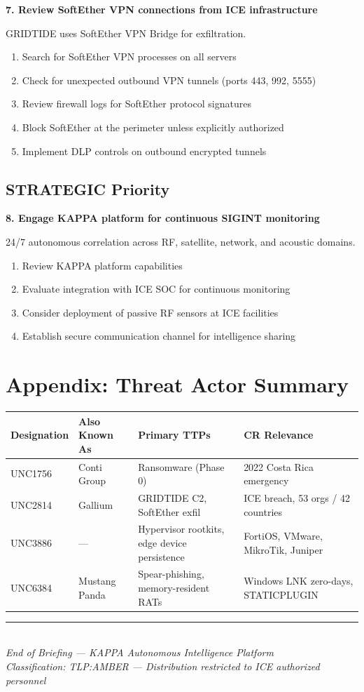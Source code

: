 \documentclass[11pt,a4paper]{article}
\begin{document}
\textbf{7. Review SoftEther VPN connections from ICE infrastructure}

GRIDTIDE uses SoftEther VPN Bridge for exfiltration.

\begin{enumerate}[label=\alph*., leftmargin=1.5cm]
\item Search for SoftEther VPN processes on all servers
\item Check for unexpected outbound VPN tunnels (ports 443, 992, 5555)
\item Review firewall logs for SoftEther protocol signatures
\item Block SoftEther at the perimeter unless explicitly authorized
\item Implement DLP controls on outbound encrypted tunnels
\end{enumerate}

\subsection{STRATEGIC Priority}

\textbf{8. Engage KAPPA platform for continuous SIGINT monitoring}

24/7 autonomous correlation across RF, satellite, network, and acoustic domains.

\begin{enumerate}[label=\alph*., leftmargin=1.5cm]
\item Review KAPPA platform capabilities
\item Evaluate integration with ICE SOC for continuous monitoring
\item Consider deployment of passive RF sensors at ICE facilities
\item Establish secure communication channel for intelligence sharing
\end{enumerate}

\section{Appendix: Threat Actor Summary}

\begin{longtable}{@{} p{2.5cm} p{3cm} p{3cm} p{5cm} @{}}
\toprule
\textbf{Designation} & \textbf{Also Known As} & \textbf{Primary TTPs} & \textbf{CR Relevance} \\
\midrule
\endfirsthead
UNC1756 & Conti Group & Ransomware (Phase 0) & 2022 Costa Rica emergency \\
UNC2814 & Gallium & GRIDTIDE C2, SoftEther exfil & ICE breach, 53 orgs / 42 countries \\
UNC3886 & --- & Hypervisor rootkits, edge device persistence & FortiOS, VMware, MikroTik, Juniper \\
UNC6384 & Mustang Panda & Spear-phishing, memory-resident RATs & Windows LNK zero-days, STATICPLUGIN \\
\bottomrule
\end{longtable}

\vfill

\begin{center}
\rule{0.6\textwidth}{0.3pt}\\[6pt]
{\small\textit{End of Briefing --- KAPPA Autonomous Intelligence Platform}}\\
{\small\textit{Classification: TLP:AMBER --- Distribution restricted to ICE authorized personnel}}
\end{center}
\end{document}
